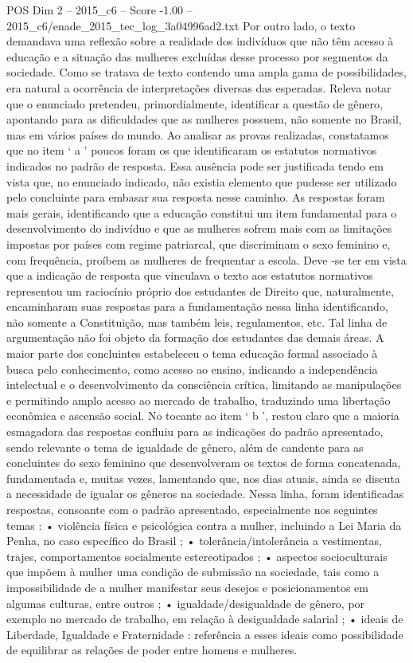 \begin{textsample}{POS Dim 2 – 2015\_c6 – Score -1.00 – 2015\_c6/enade\_2015\_tec\_log\_3a04996ad2.txt}
Por outro lado, o texto demandava uma reflexão sobre a realidade dos indivíduos que não têm acesso à educação e a situação das mulheres excluídas desse processo por segmentos da sociedade.
Como se tratava de texto contendo uma ampla gama de possibilidades, era natural a ocorrência de interpretações diversas das esperadas.
Releva notar que o enunciado pretendeu, primordialmente, identificar a questão de gênero, apontando para as dificuldades que as mulheres possuem, não somente no Brasil, mas em vários países do mundo.
Ao analisar as provas realizadas, constatamos que no item ‘ a ’ poucos foram os que identificaram os estatutos normativos indicados no padrão de resposta.
Essa ausência pode ser justificada tendo em vista que, no enunciado indicado, não existia elemento que pudesse ser utilizado pelo concluinte para embasar sua resposta nesse caminho.
As respostas foram mais gerais, identificando que a educação constitui um item fundamental para o desenvolvimento do indivíduo e que as mulheres sofrem mais com as limitações impostas por países com regime patriarcal, que discriminam o sexo feminino e, com frequência, proíbem as mulheres de frequentar a escola.
Deve -se ter em vista que a indicação de resposta que vinculava o texto aos estatutos normativos representou um raciocínio próprio dos estudantes de Direito que, naturalmente, encaminharam suas respostas para a fundamentação nessa linha identificando, não somente a Constituição, mas também leis, regulamentos, etc.
Tal linha de argumentação não foi objeto da formação dos estudantes das demais áreas.
A maior parte dos concluintes estabeleceu o tema educação formal associado à busca pelo conhecimento, como acesso ao ensino, indicando a independência intelectual e o desenvolvimento da consciência crítica, limitando as manipulações e permitindo amplo acesso ao mercado de trabalho, traduzindo uma libertação econômica e ascensão social.
No tocante ao item ‘ b ’, restou claro que a maioria esmagadora das respostas confluiu para as indicações do padrão apresentado, sendo relevante o tema de igualdade de gênero, além de candente para as concluintes do sexo feminino que desenvolveram os textos de forma concatenada, fundamentada e, muitas vezes, lamentando que, nos dias atuais, ainda se discuta a necessidade de igualar os gêneros na sociedade.
Nessa linha, foram identificadas respostas, consoante com o padrão apresentado, especialmente nos seguintes temas : • violência física e psicológica contra a mulher, incluindo a Lei Maria da Penha, no caso específico do Brasil ; • tolerância/intolerância a vestimentas, trajes, comportamentos socialmente estereotipados ; • aspectos socioculturais que impõem à mulher uma condição de submissão na sociedade, tais como a impossibilidade de a mulher manifestar seus desejos e posicionamentos em algumas culturas, entre outros ; • igualdade/desigualdade de gênero, por exemplo no mercado de trabalho, em relação à desigualdade salarial ; • ideais de Liberdade, Igualdade e Fraternidade : referência a esses ideais como possibilidade de equilibrar as relações de poder entre homens e mulheres.

\end{textsample}
